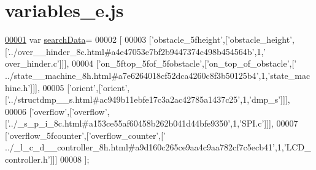 \hypertarget{variables__e_8js_source}{}\section{variables\+\_\+e.\+js}
\label{variables__e_8js_source}

\begin{DoxyCode}
\hypertarget{variables__e_8js_source.tex_l00001}{}\hyperlink{variables__e_8js_ad01a7523f103d6242ef9b0451861231e}{00001} var \hyperlink{variables__e_8js_ad01a7523f103d6242ef9b0451861231e}{searchData}=
00002 [
00003   [\textcolor{stringliteral}{'obstacle\_5fheight'},[\textcolor{stringliteral}{'obstacle\_height'},[\textcolor{stringliteral}{'../over\_\_hinder\_8c.html#a4e47053e7bf2b9447374c498b454564b'},1,\textcolor{stringliteral}{'
      over\_hinder.c'}]]],
00004   [\textcolor{stringliteral}{'on\_5ftop\_5fof\_5fobstacle'},[\textcolor{stringliteral}{'on\_top\_of\_obstacle'},[\textcolor{stringliteral}{'
      ../state\_\_machine\_8h.html#a7e6264018cf52dca4260c8f3b50125b4'},1,\textcolor{stringliteral}{'state\_machine.h'}]]],
00005   [\textcolor{stringliteral}{'orient'},[\textcolor{stringliteral}{'orient'},[\textcolor{stringliteral}{'../structdmp\_\_s.html#ac949b11ebfe17c3a2ac42785a1437c25'},1,\textcolor{stringliteral}{'dmp\_s'}]]],
00006   [\textcolor{stringliteral}{'overflow'},[\textcolor{stringliteral}{'overflow'},[\textcolor{stringliteral}{'../\_s\_p\_i\_8c.html#a153ce55af60458b262b041d44bfe9350'},1,\textcolor{stringliteral}{'SPI.c'}]]],
00007   [\textcolor{stringliteral}{'overflow\_5fcounter'},[\textcolor{stringliteral}{'overflow\_counter'},[\textcolor{stringliteral}{'
      ../\_l\_c\_d\_\_controller\_8h.html#a9d160c265ce9aa4c9aa782cf7c5ecb41'},1,\textcolor{stringliteral}{'LCD\_controller.h'}]]]
00008 ];
\end{DoxyCode}

